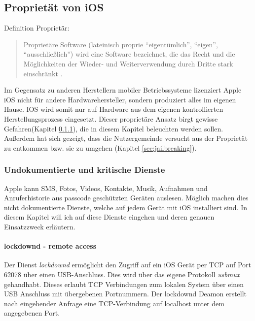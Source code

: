 \subsection{Proprietät von iOS}\label{sec:proprietaer-ios}
	Definition Proprietär:
	\begin{quote}
		Proprietäre Software (lateinisch proprie "`eigentümlich"', "`eigen"',
		"`ausschließlich"') wird eine Software bezeichnet, die das Recht und die
		Möglichkeiten der Wieder- und Weiterverwendung durch Dritte stark einschränkt
		\cite{WikiProprietary2015}.
	\end{quote}
	Im Gegensatz zu anderen Herstellern mobiler Betriebssysteme lizenziert Apple
	iOS nicht für andere Hardwarehersteller, sondern produziert alles im
	eigenen Hause. IOS wird somit nur auf Hardware aus dem eigenen kontrollierten
	Herstellungsprozess eingesetzt. Dieser proprietäre Ansatz birgt gewisse
	Gefahren(Kapitel
	\ref{sec:undocumented-services}), die in diesem Kapitel beleuchten werden
	sollen. Außerdem hat sich gezeigt, dass die Nutzergemeinde versucht aus der
	Proprietät zu entkommen bzw. sie zu umgehen (Kapitel \ref{sec:jailbreaking}).
	
	\subsubsection{Undokumentierte und kritische
	Dienste}\label{sec:undocumented-services}
		Apple kann SMS, Fotos, Videos, Kontakte, Musik, Aufnahmen und Anruferhistorie
		aus passcode geschützten Geräten auslesen. Möglich machen dies nicht
		dokumentierte Dienste, welche auf jedem Gerät mit iOS installiert sind. In
		diesem Kapitel will ich auf diese Dienste eingehen und deren genauen
		Einsatzzweck erläutern.
		\paragraph{lockdownd - remote access}
			Der Dienst \textsl{lockdownd} ermöglicht den Zugriff auf ein iOS Gerät
			per TCP auf Port 62078 über einen USB-Anschluss.
			Dies wird über das eigene Protokoll \textsl{usbmux} gehandhabt. Dieses
			erlaubt TCP Verbindungen zum lokalen System über einen USB Anschluss mit
			übergebenen	Portnummern. Der lockdownd Deamon erstellt nach eingehender
			Anfrage eine TCP-Verbindung auf localhost unter dem angegebenen Port.
